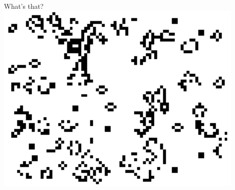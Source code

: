 \begin{frame}
    \titlepage
\end{frame}

\begin{frame}{What's that?}
    \includegraphics[width=0.9\linewidth]{../paper/figures/game_of_life_still}
\end{frame}

